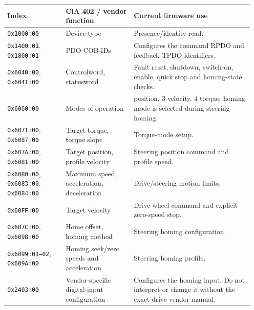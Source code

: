 \documentclass[
  10pt,
  letterpaper,
  openany]{report}
\newcounter{none} %
\begin{document}
{\def\LTcaptype{none} %
\begin{longtable}[]{@{}
  >{\raggedright\arraybackslash}p{}
  >{\raggedright\arraybackslash}p{}
  >{\raggedright\arraybackslash}p{}@{}}
\toprule\noalign{}
\begin{minipage}[b]{\linewidth}\raggedright
Index
\end{minipage} & \begin{minipage}[b]{\linewidth}\raggedright
CiA 402 / vendor function
\end{minipage} & \begin{minipage}[b]{\linewidth}\raggedright
Current firmware use
\end{minipage} \\
\midrule\noalign{}
\endhead
\bottomrule\noalign{}
\endlastfoot
\texttt{0x1000:00} & Device type & Presence/identity read. \\
\texttt{0x1400:01}, \texttt{0x1800:01} & PDO COB-IDs & Configures the
command RPDO and feedback TPDO identifiers. \\
\texttt{0x6040:00}, \texttt{0x6041:00} & Controlword, statusword & Fault
reset, shutdown, switch-on, enable, quick stop and homing-state
checks. \\
\texttt{0x6060:00} & Modes of operation & 1 position, 3 velocity, 4
torque; homing mode is selected during steering homing. \\
\texttt{0x6071:00}, \texttt{0x6087:00} & Target torque, torque slope &
Torque-mode setup. \\
\texttt{0x607A:00}, \texttt{0x6081:00} & Target position, profile
velocity & Steering position command and profile speed. \\
\texttt{0x6080:00}, \texttt{0x6083:00}, \texttt{0x6084:00} & Maximum
speed, acceleration, deceleration & Drive/steering motion limits. \\
\texttt{0x60FF:00} & Target velocity & Drive-wheel command and explicit
zero-speed stop. \\
\texttt{0x607C:00}, \texttt{0x6098:00} & Home offset, homing method &
Steering homing configuration. \\
\texttt{0x6099:01–02}, \texttt{0x609A:00} & Homing seek/zero speeds and
acceleration & Steering homing profile. \\
\texttt{0x2403:00} & Vendor-specific digital-input configuration &
Configures the homing input. Do not interpret or change it without the
exact drive vendor manual. \\
\end{longtable}
}
\end{document}
